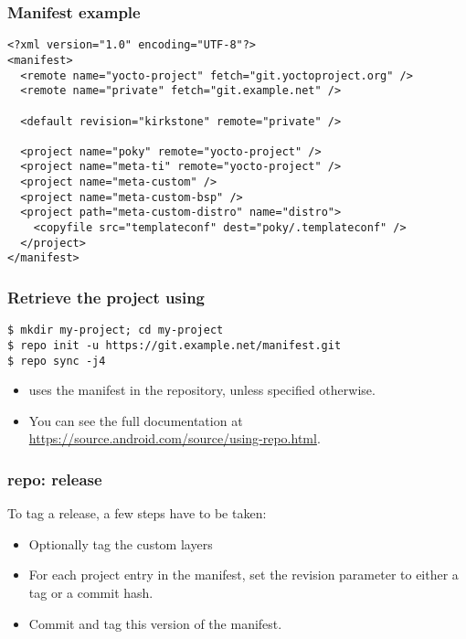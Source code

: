 \begin{frame}[fragile]
  \frametitle{Manifest example}
  \begin{block}{}
  \fontsize{9}{9}\selectfont
  \begin{verbatim}
<?xml version="1.0" encoding="UTF-8"?>
<manifest>
  <remote name="yocto-project" fetch="git.yoctoproject.org" />
  <remote name="private" fetch="git.example.net" />

  <default revision="kirkstone" remote="private" />

  <project name="poky" remote="yocto-project" />
  <project name="meta-ti" remote="yocto-project" />
  <project name="meta-custom" />
  <project name="meta-custom-bsp" />
  <project path="meta-custom-distro" name="distro">
    <copyfile src="templateconf" dest="poky/.templateconf" />
  </project>
</manifest>
  \end{verbatim}
  \end{block}
\end{frame}

\begin{frame}[fragile]
  \frametitle{Retrieve the project using }
  \begin{verbatim}
$ mkdir my-project; cd my-project
$ repo init -u https://git.example.net/manifest.git
$ repo sync -j4
  \end{verbatim}
  \begin{itemize}
    \item {} uses the  manifest in the
    repository, unless specified otherwise.
    \item You can see the full  documentation at
      \url{https://source.android.com/source/using-repo.html}.
  \end{itemize}
\end{frame}

\begin{frame}[fragile]
  \frametitle{repo: release}
  To tag a release, a few steps have to be taken:
  \begin{itemize}
  \item Optionally tag the custom layers
  \item For each project entry in the manifest, set the revision
    parameter to either a tag or a commit hash.
  \item Commit and tag this version of the manifest.
  \end{itemize}
\end{frame}

